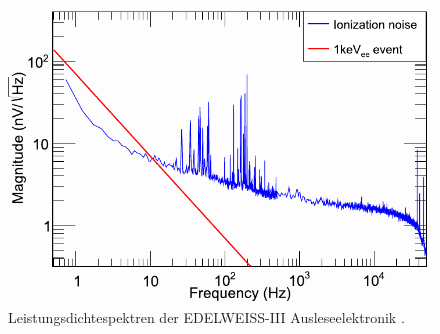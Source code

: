 \begin{figure}[!t]
\begin{center}
\includegraphics[width=\textwidth]{./fig/Rauschen/EDWIIIPerformance.pdf}
\vspace{-0.5cm}
\caption{Leistungsdichtespektren der EDELWEISS-III Ausleseelektronik \cite{EDWIII}.}
\label{fig:EDWIII}
\end{center}
\end{figure}

